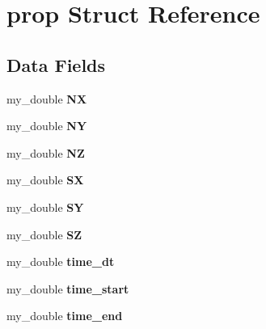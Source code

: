 \hypertarget{structprop}{\section{prop Struct Reference}
\label{structprop}
}
\subsection*{Data Fields}
\begin{DoxyCompactItemize}
\item 
\hypertarget{structprop_a12df6249e1881ef6fb712874c5b901b2}{my\-\_\-double {\bfseries N\-X}}\label{structprop_a12df6249e1881ef6fb712874c5b901b2}

\item 
\hypertarget{structprop_a583a7335181791a78d19a55fc3e43d30}{my\-\_\-double {\bfseries N\-Y}}\label{structprop_a583a7335181791a78d19a55fc3e43d30}

\item 
\hypertarget{structprop_aae9cecddb39687c40c919a4c82dde506}{my\-\_\-double {\bfseries N\-Z}}\label{structprop_aae9cecddb39687c40c919a4c82dde506}

\item 
\hypertarget{structprop_a7d2c459c6674c9084f720b2a1d0d2962}{my\-\_\-double {\bfseries S\-X}}\label{structprop_a7d2c459c6674c9084f720b2a1d0d2962}

\item 
\hypertarget{structprop_aa39104c25dab9479fc23794c20cf6cf9}{my\-\_\-double {\bfseries S\-Y}}\label{structprop_aa39104c25dab9479fc23794c20cf6cf9}

\item 
\hypertarget{structprop_a541939bbad80323ba13976c06a33c5fb}{my\-\_\-double {\bfseries S\-Z}}\label{structprop_a541939bbad80323ba13976c06a33c5fb}

\item 
\hypertarget{structprop_acac6d78020fd6cb0df9b3f98f4f36a68}{my\-\_\-double {\bfseries time\-\_\-dt}}\label{structprop_acac6d78020fd6cb0df9b3f98f4f36a68}

\item 
\hypertarget{structprop_a856501b07e5337c137590803c42287f3}{my\-\_\-double {\bfseries time\-\_\-start}}\label{structprop_a856501b07e5337c137590803c42287f3}

\item 
\hypertarget{structprop_a14b0d39bf15aebf6f07bfc67ba124a7a}{my\-\_\-double {\bfseries time\-\_\-end}}\label{structprop_a14b0d39bf15aebf6f07bfc67ba124a7a}


\end{DoxyCompactItemize}
